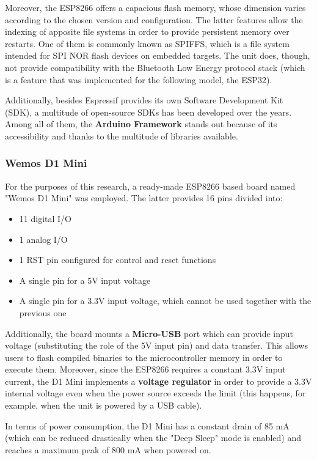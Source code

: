 Moreover, the ESP8266 offers a capacious flash memory, whose dimension varies according to the chosen version and configuration. The latter features allow the indexing of apposite file systems in order to provide persistent memory over restarts. One of them is commonly known as SPIFFS, which is a file system intended for SPI NOR flash devices on embedded targets. The unit does, though, not provide compatibility with the Bluetooth Low Energy protocol stack (which is a feature that was implemented for the following model, the ESP32).

Additionally, besides Espressif provides its own Software Development Kit (SDK), a multitude of open-source SDKs has been developed over the years. Among all of them, the \textbf{Arduino Framework} stands out because of its accessibility and thanks to the multitude of libraries available. 

\subsubsection{Wemos D1 Mini}\label{subsubsec:d1mini}

For the purposes of this research, a ready-made ESP8266 based board named "Wemos D1 Mini" was employed. The latter provides 16 pins divided into:

\begin{itemize}
    \item 11 digital I/O
    \item 1 analog I/O
    \item 1 RST pin configured for control and reset functions
    \item A single pin for a 5V input voltage
    \item A single pin for a 3.3V input voltage, which cannot be used together with the previous one
\end{itemize}

Additionally, the board mounts a \textbf{Micro-USB} port which can provide input voltage (substituting the role of the 5V input pin) and data transfer. This allows users to flash compiled binaries to the microcontroller memory in order to execute them. Moreover, since the ESP8266 requires a constant 3.3V input current, the D1 Mini implements a \textbf{voltage regulator} in order to provide a 3.3V internal voltage even when the power source exceeds the limit (this happens, for example, when the unit is powered by a USB cable).

In terms of power consumption, the D1 Mini has a constant drain of 85 mA (which can be reduced drastically when the "Deep Sleep" mode is enabled) and reaches a maximum peak of 800 mA when powered on.

